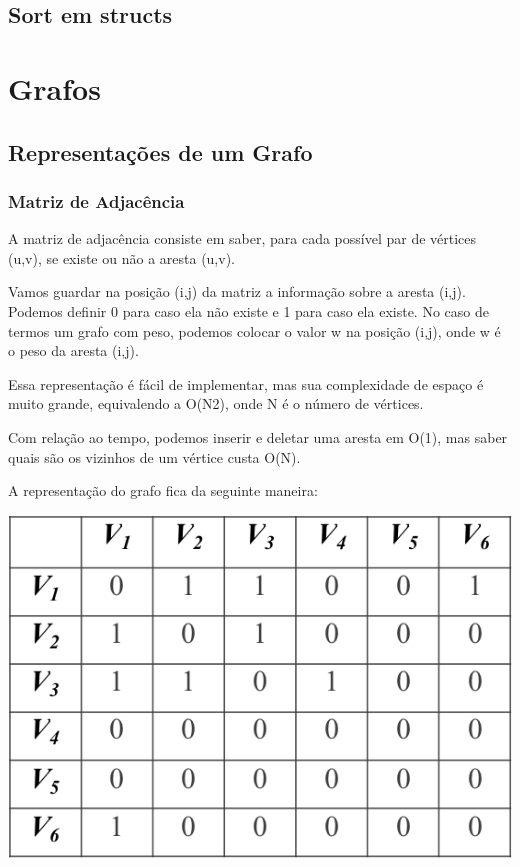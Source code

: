\documentclass[a4paper,12pt]{article}
\begin{document}
\subsection{Sort em structs}

\newpage
\section{Grafos}
\subsection{Representações de um Grafo}
\subsubsection{Matriz de Adjacência}

\indent\indent A matriz de adjacência consiste em saber, para cada possível par de vértices (u,v), se existe ou não a aresta (u,v).

\indent Vamos guardar na posição (i,j) da matriz a informação sobre a aresta (i,j). Podemos definir 0 para caso ela não existe e 1 para caso ela existe. No caso de termos um grafo com peso, podemos colocar o valor w na posição (i,j), onde w é o peso da aresta (i,j).

\indent Essa representação é fácil de implementar, mas sua complexidade de espaço é muito grande, equivalendo a O(N2), onde N é o número de vértices.

\indent Com relação ao tempo, podemos inserir e deletar uma aresta em O(1), mas saber quais são os vizinhos de um vértice custa O(N).

\indent A representação do grafo fica da seguinte maneira:

\begin{center}
  \includegraphics[width=\linewidth/2]{figures/grafos/representacao_matriz_adj.png}
\end{center}
\end{document}
